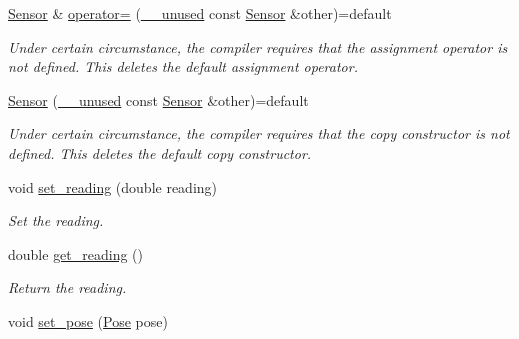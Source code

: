 \begin{DoxyCompactItemize}
\mbox{\label{class_sensor_a6ef17b207fce459422bee2410ec15c65}} 
\mbox{\hyperlink{class_sensor}{Sensor}} \& \mbox{\hyperlink{class_sensor_a6ef17b207fce459422bee2410ec15c65}{operator=}} (\mbox{\hyperlink{common_8h_a2e3484535ee610c8e19e9859563abe48}{\+\_\+\+\_\+unused}} const \mbox{\hyperlink{class_sensor}{Sensor}} \&other)=default
\begin{DoxyCompactList}\small\item\em Under certain circumstance, the compiler requires that the assignment operator is not defined. This {\ttfamily deletes} the default assignment operator. \end{DoxyCompactList}\item 
\mbox{\label{class_sensor_af2e786d46a120c438bceb25a27bcbf6c}} 
\mbox{\hyperlink{class_sensor_af2e786d46a120c438bceb25a27bcbf6c}{Sensor}} (\mbox{\hyperlink{common_8h_a2e3484535ee610c8e19e9859563abe48}{\+\_\+\+\_\+unused}} const \mbox{\hyperlink{class_sensor}{Sensor}} \&other)=default
\begin{DoxyCompactList}\small\item\em Under certain circumstance, the compiler requires that the copy constructor is not defined. This {\ttfamily deletes} the default copy constructor. \end{DoxyCompactList}\item 
\mbox{\label{class_sensor_a625b6e47344cd827fac400e853240331}} 
void \mbox{\hyperlink{class_sensor_a625b6e47344cd827fac400e853240331}{set\+\_\+reading}} (double reading)
\begin{DoxyCompactList}\small\item\em Set the reading. \end{DoxyCompactList}\item 
\mbox{\label{class_sensor_a5276b83e9c880ef379fe9b08293e61cf}} 
double \mbox{\hyperlink{class_sensor_a5276b83e9c880ef379fe9b08293e61cf}{get\+\_\+reading}} ()
\begin{DoxyCompactList}\small\item\em Return the reading. \end{DoxyCompactList}\item 
\mbox{\label{class_sensor_a2d82072c0e2cb2e4663993eea261ea5f}} 
void \mbox{\hyperlink{class_sensor_a2d82072c0e2cb2e4663993eea261ea5f}{set\+\_\+pose}} (\mbox{\hyperlink{struct_pose}{Pose}} pose)

\end{DoxyCompactItemize}
